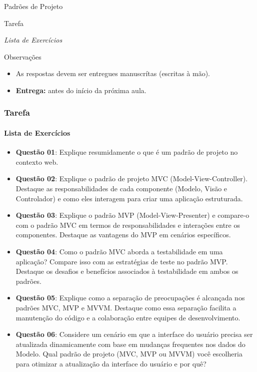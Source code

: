 \documentclass[
	9pt, %
	t, %
]{beamer}
\begin{document}
\begin{frame}
	\begin{center}
		
		\bigskip\bigskip\bigskip\bigskip %
		{\Large Padrões de Projeto}
		
		\bigskip\bigskip %
		{\Huge Tarefa}
		
		\smallskip
		{\small \textit{Lista de Exercícios}}

		\bigskip\bigskip
		\begin{block}{Observações}
			\begin{itemize}
				\item As respostas devem ser entregues manuscrítas (escritas à mão).
				\item \textbf{Entrega:} antes do início da próxima aula.
			\end{itemize}
		\end{block}
	\end{center}

\end{frame}

\begin{frame}
	\frametitle{Tarefa}
	\framesubtitle{Lista de Exercícios}
	
	\begin{itemize}
		\item { \small \textbf{Questão 01}: Explique resumidamente o que é um padrão de projeto no contexto web. }
		\item { \small \textbf{Questão 02}: Explique o padrão de projeto MVC (Model-View-Controller). Destaque as responsabilidades de cada componente (Modelo, Visão e Controlador) e como eles interagem para criar uma aplicação estruturada. }
		\item { \small \textbf{Questão 03}: Explique o padrão MVP (Model-View-Presenter) e compare-o com o padrão MVC em termos de responsabilidades e interações entre os componentes. Destaque as vantagens do MVP em cenários específicos. }
		\item { \small \textbf{Questão 04}: Como o padrão MVC aborda a testabilidade em uma aplicação? Compare isso com as estratégias de teste no padrão MVP. Destaque os desafios e benefícios associados à testabilidade em ambos os padrões. }
		\item { \small \textbf{Questão 05}: Explique como a separação de preocupações é alcançada nos padrões MVC, MVP e MVVM. Destaque como essa separação facilita a manutenção do código e a colaboração entre equipes de desenvolvimento. }
		\item { \small \textbf{Questão 06}: Considere um cenário em que a interface do usuário precisa ser atualizada dinamicamente com base em mudanças frequentes nos dados do Modelo. Qual padrão de projeto (MVC, MVP ou MVVM) você escolheria para otimizar a atualização da interface do usuário e por quê? }
	\end{itemize}
	
\end{frame}
\end{document}

